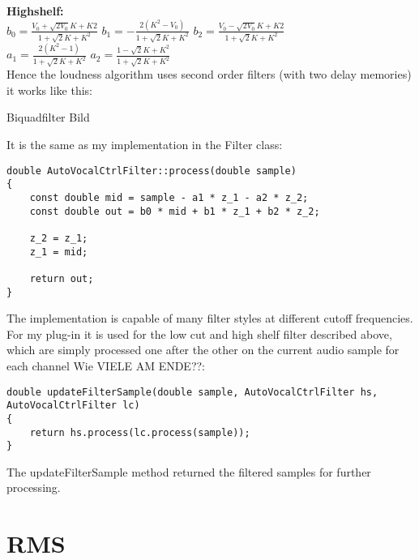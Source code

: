 \textbf{Highshelf:}\\
$b_0 = \frac{V_0+\sqrt{2V_0}K+K2}{1+\sqrt{2}K+K^2}$ \tab[0.4cm] $b_1 = -\frac{2(K^2-V_0)}{1+\sqrt{2}K+K^2}$ \tab $b_2 = \frac{V_0-\sqrt{2V_0}K+K2}{1+\sqrt{2}K+K^2}$\\
$a_1 = \frac{2(K^2-1)}{1+\sqrt{2}K+K^2}$ \tab $a_2 = \frac{1-\sqrt{2}K+K^2}{1+\sqrt{2}K+K^2}$\\

Hence the loudness algorithm uses second order filters (with two delay memories) it works like this:

Biquadfilter Bild

It is the same as my implementation in the Filter class:\\

\begin{lstlisting}[frame=single]
double AutoVocalCtrlFilter::process(double sample)
{
    const double mid = sample - a1 * z_1 - a2 * z_2;
    const double out = b0 * mid + b1 * z_1 + b2 * z_2;
    
    z_2 = z_1;
    z_1 = mid;
    
    return out;
}
\end{lstlisting}

The implementation is capable of many filter styles at different cutoff frequencies. For my plug-in it is used for the low cut and high shelf filter described above, which are simply processed one after the other on the current audio sample for each channel Wie VIELE AM ENDE??:\\

\begin{lstlisting}[frame=single]
double updateFilterSample(double sample, AutoVocalCtrlFilter hs,
AutoVocalCtrlFilter lc)
{
    return hs.process(lc.process(sample));
}
\end{lstlisting}

The updateFilterSample method returned the filtered samples for further processing.\\

\section{RMS}

